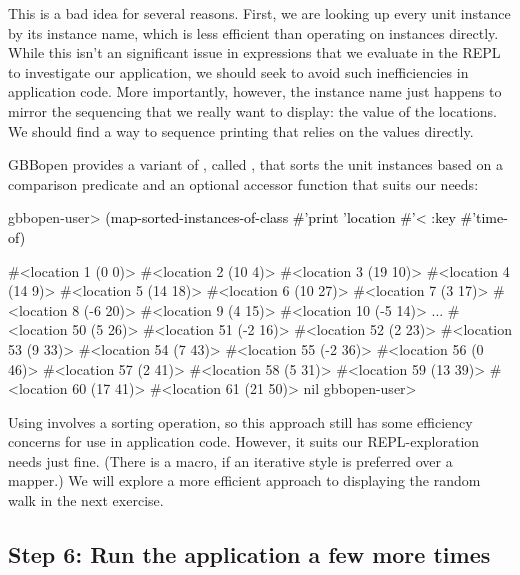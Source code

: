 \documentclass[10pt,twoside,english,pdftex]{article}
\begin{document}
This is a bad idea for several reasons.  First, we are looking up every
 unit instance by its instance name, which is less
efficient than operating on  instances directly.  While
this isn't an significant issue in expressions that we evaluate in the REPL to
investigate our application, we should seek to avoid such inefficiencies in
application code.  More importantly, however, the 
instance name just happens to mirror the sequencing that we really want to
display: the  value of the locations.  We should find a way to
sequence  printing that relies on the  values
directly.

%
%
GBBopen provides a variant of , called
, that sorts the unit instances
based on a comparison predicate and an optional  accessor function
that suits our needs:
%
\W\supp
\begin{example}
\textcolor{darkergray}{%
  gbbopen-user> \textcolor{black}{(map-sorted-instances-of-class #'print 'location #'< 
                   :key #'time-of)}

  #<location 1 (0 0)> 
  #<location 2 (10 4)> 
  #<location 3 (19 10)> 
  #<location 4 (14 9)> 
  #<location 5 (14 18)> 
  #<location 6 (10 27)> 
  #<location 7 (3 17)> 
  #<location 8 (-6 20)> 
  #<location 9 (4 15)> 
  #<location 10 (-5 14)> 
       ...
  #<location 50 (5 26)> 
  #<location 51 (-2 16)> 
  #<location 52 (2 23)> 
  #<location 53 (9 33)> 
  #<location 54 (7 43)> 
  #<location 55 (-2 36)> 
  #<location 56 (0 46)> 
  #<location 57 (2 41)> 
  #<location 58 (5 31)> 
  #<location 59 (13 39)> 
  #<location 60 (17 41)> 
  #<location 61 (21 50)> 
  nil
  gbbopen-user>}
\end{example}

%
%
Using  involves a sorting
operation, so this approach still has some efficiency concerns for use in
application code.  However, it suits our REPL-exploration needs just fine.
(There is a  macro, if an
iterative style is preferred over a mapper.)  We will explore a more efficient
approach to displaying the random walk in the next exercise.

\subsection*{Step 6:  Run the application a few more times}
\end{document}
